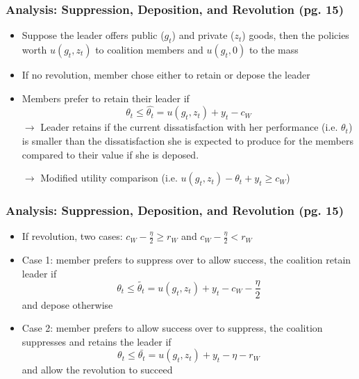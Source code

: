 \documentclass[10pt,handout]{beamer}
\begin{document}
\begin{frame}
\frametitle{Analysis: Suppression, Deposition, and Revolution (pg. 15)}
\begin{itemize}
    \item Suppose the leader offers public ($g_t$) and private ($z_t$) goods, then the policies worth $u(g_t, z_t)$ to coalition members and $u(g_t, 0)$ to the mass
    \item If no revolution, member chose either to retain or depose the leader
    \item Members prefer to retain their leader if
    \[
        \theta_t \leq \hat{\theta_t} = u(g_t, z_t) + y_t - c_W
    \]
    $\rightarrow$ Leader retains if the current dissatisfaction with her performance (i.e. $\theta_t$) is smaller than the dissatisfaction she is expected to produce for the members compared to their value if she is deposed. \par
    $\rightarrow$ Modified utility comparison (i.e. $u(g_t, z_t) - \theta_t + y_t \geq c_W$)    
\end{itemize}
\end{frame}

\begin{frame}
\frametitle{Analysis: Suppression, Deposition, and Revolution (pg. 15)}
\begin{itemize}
    \item If revolution, two cases: $c_W - \frac{\eta}{2} \geq r_W$ and $c_W - \frac{\eta}{2} < r_W$
    \item[] Case 1: member prefers to suppress over to allow success, the coalition retain leader if
    \[
        \theta_t \leq \tilde{\theta_t} = u(g_t, z_t) + y_t - c_W - \frac{\eta}{2}
    \]
    and depose otherwise
    \item[] Case 2: member prefers to allow success over to suppress, the coalition suppresses and retains the leader if
    \[
        \theta_t \leq \bar{\theta_t} = u(g_t, z_t) + y_t - \eta - r_W
    \]
    and allow the revolution to succeed
\end{itemize}
\end{frame}
\end{document}
